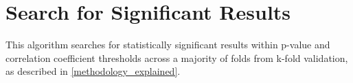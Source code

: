 \chapter{Search for Significant Results}
\label{search_for_correlation_coefficients}

This algorithm searches for statistically significant results within p-value and
\tau{} correlation coefficient thresholds across a majority of folds from k-fold
validation, as described in
\cref{methodology_explained}.

\begin{figure}[h]

\end{figure}
\begin{figure}[h]

\end{figure}
\begin{figure}[h]

\end{figure}
